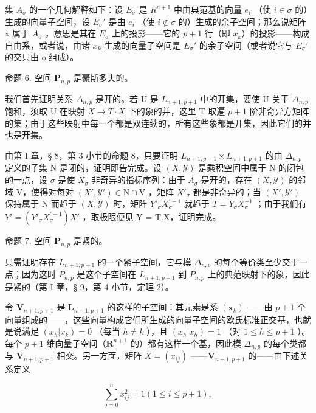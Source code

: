 集 \(A_{\sigma}\) 的一个几何解释如下：设 \(E_{\sigma}\) 是 \(R^{n+1}\) 中由典范基的向量 \(e_{i}\) （使 \(i \in \sigma\) 的）生成的向量子空间，设 \(E_{\sigma}'\) 是由 \(e_{i}\) （使 \(i \notin \sigma\) 的）生成的余子空间；那么说矩阵 x 属于 \(A_{\sigma}\) ，意思是其在 \(E_{\sigma}\) 上的投影——它的 \(p + 1\) 行（即 \(x_{k}\)）的投影——构成自由系，或者说，由诸 \(x_{k}\) 生成的向量子空间是 \(E_{\sigma}'\) 的余子空间（或者说它与 \(E_{\sigma}'\) 的交只由 o 组成）。

命题 6. 空间 \(\mathbf{P}_{n,p}\) 是豪斯多夫的。

我们首先证明关系 \(\Delta_{n,p}\) 是开的。若 U 是 \(L_{n+1,p+1}\) 中的开集，要使 U 关于 \(\Delta_{n,p}\) 饱和，须取 U 在映射 \(X \to T \cdot X\) 下的象的并，这里 T 取遍 \(p + 1\) 阶非奇异方矩阵的集；由于这些映射中每一个都是双连续的，所有这些象都是开集，因此它们的并也是开集。

由第 I 章，§ 8，第 3 小节的命题 8，只要证明 \(L_{n+1,p+1} \times L_{n+1,p+1}\) 的由 \(\Delta_{n,p}\) 定义的子集 N 是闭的，证明即告完成。设 \((X,\mathcal{Y})\) 是乘积空间中属于 N 的闭包的一点，设 \(\sigma\) 是使 \(X_{\sigma}\) 非奇异的指标序列：由于 \(A_{\sigma}\) 是开的，存在 \((X,\mathcal{Y})\) 的邻域 V，使得对每对 \((X',\mathcal{Y}') \in \mathrm{N} \cap \mathrm{V}\) ，矩阵 \(X'_{\sigma}\) 都是非奇异的；当 \((X',\mathcal{Y}')\) 保持属于 N 而趋于 \((X,\mathcal{Y})\) 时，矩阵 \(Y'_{\sigma}X_{\sigma}^{\prime -1}\) 就趋于 \(T = Y_{\sigma}X_{\sigma}^{-1}\) ；由于我们有 \(Y' = (Y'_{\sigma}X_{\sigma}^{\prime -1})X'\) ，取极限便见 Y = T.X，证明完成。

命题 7. 空间 \(\mathbf{P}_{n,p}\) 是紧的。

只需证明存在 \(L_{n+1, p+1}\) 的一个紧子空间，它与模 \(\Delta_{n,p}\) 的每个等价类至少交于一点；因为这时 \(P_{n,p}\) 是这个子空间在 \(L_{n+1, p+1}\) 到 \(P_{n,p}\) 上的典范映射下的象，因此是紧的（第 I 章，§ 9，第 4 小节，定理 2）。

令 \(\mathbf{V}_{n+1, p+1}\) 是 \(\mathbf{L}_{n+1, p+1}\) 的这样的子空间：其元素是系 \((\boldsymbol{x}_k)\) ——由 \(p + 1\) 个向量组成的——，这些向量构成它们所生成的向量子空间的欧氏标准正交基，也就是说满足 \((x_h | x_k) = 0\) （每当 \(h \neq k\) ），且 \((x_h | x_h) = 1\) （对 \(1 \leqslant h \leqslant p + 1\) ）。每个 \(p + 1\) 维向量子空间（\(\mathbf{R}^{n+1}\) 的）都有这样一个基，因此模 \(\Delta_{n,p}\) 的每个类都与 \(\mathbf{V}_{n+1, p+1}\) 相交。另一方面，矩阵 \(X = (x_{ij})\) ——\(\mathbf{V}_{n+1, p+1}\) 的——由下述关系定义

\[
\sum_ {j = 0} ^ {n} x _ {i j} ^ {2} = 1 (1 \leqslant i \leqslant p + 1),
\]

